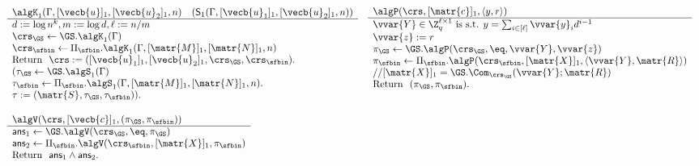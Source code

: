 \begin{figure} 
$$
\begin{array}{ll}
\begin{array}{l}
\algK_1(\Gamma,[\vecb{u}]_1,[\vecb{u}_2]_1,n)\quad (\mathsf{S}_1(\Gamma,[\vecb{u}_1]_1,[\vecb{u}_2]_1,n))\\
\hline
d:=\log n^k, m:=\log d, \ell := n/m\\
\crs_\GS\gets\GS.\algK_1(\Gamma)\\
{\crs_\sfbin\gets\Pi_\sfbin.\algK_1(\Gamma,[\matr{M}]_1,[\matr{N}]_1,n)}\\
\text{Return } \ \crs:=([\vecb{u}_1]_1,[\vecb{u}_2]_1,\crs_\GS,\crs_\sfbin).\\
(\tau_\GS\gets\GS.\algS_1(\Gamma)\\
\tau_\sfbin\gets\Pi_\sfbin.\algS_1(\Gamma,[\matr{M}]_1,[\matr{N}]_1,n).\\
\tau := (\matr{S},\tau_\GS,\tau_\sfbin)).\\
\\
\end{array}
&
\begin{array}{l}
{\algP(\crs, [\matr{c}]_1, \langle y, r\rangle)}\\
\hline
\vvar{Y}\in\Z_q^{\ell\times1} \text{ is s.t. } y=\sum_{i\in[\ell]}\vvar{y}_id^{i-1}\\
\vvar{z}:=r\\
\pi_\GS\gets\GS.\algP(\crs_\GS,\eq,\vvar{Y},\vvar{z})\\
\pi_\sfbin \gets \Pi_\sfbin.\algP(\crs_\sfbin, [\matr{X}]_1,\langle\vvar{Y},\matr{R}\rangle)\\
//{[\matr{X}]_1} = \GS.\Com_{\crs_\GS}(\vvar{Y};\matr{R})\\
\text{Return } \  (\pi_\GS,\pi_\sfbin). \\
\\
\\
\end{array}\\
\begin{array}{l}
{\algV(\crs,[\vecb{c}]_1,(\pi_\GS,\pi_\sfbin))}\\
\hline
\mathsf{ans}_1 \gets \GS.\algV(\crs_\GS,\eq,\pi_\GS)\\
\mathsf{ans}_2 \gets \Pi_\sfbin.\algV(\crs_\sfbin,[\matr{X}]_1,\pi_\sfbin)\\
\text{Return } \ \mathsf{ans}_1\wedge\mathsf{ans}_2.
\\
\\
\end{array}
&
\begin{array}{l}

\end{array}
\end{array}$$
\end{figure}
